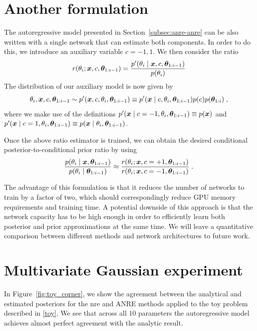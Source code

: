 \begin{subappendices}

\section{Another formulation} \label{apx:anre-anre}

 The autoregressive model presented in Section~\ref{subsec:anre-anre} can be also written with a single network that can estimate both components. In order to do this, we introduce an auxiliary variable $c = -1, 1$.  We then consider the ratio
\begin{equation}
    r(\theta_i; \bm{x}, c, \bm{\theta}_{1:i-1})
    =\frac
    {
    p'(\theta_i \mid \bm{x}, c, \bm{\theta}_{1:i-1})
    }{
    p(\theta_i)
    }
\end{equation}
The distribution of our auxiliary model is now given by
\begin{equation}
	\theta_i, \bm{x}, c, \bm{\theta}_{1:i-1} \sim p'(\bm{x} , c, \theta_i, \bm{\theta}_{1:i-1})\equiv p'(\bm{x} \mid c, \theta_i, \bm{\theta}_{1:i-1})p(c) p(\bm{\theta}_{1:i})\;,
\end{equation}
where we make use of the definitions
$p'(\bm{x} \mid c = -1, \theta_i, \bm{\theta}_{1:i-1}) \equiv p(\bm{x})$  and
$p'(\bm{x} \mid c = 1, \theta_i, \bm{\theta}_{1:i-1}) \equiv
p(\bm{x} \mid \theta_i, \bm{\theta}_{1:i-1})$.

Once the above ratio estimator is trained, we can obtain the desired conditional posterior-to-conditional prior ratio by using
\begin{equation}
\frac{
p(\theta_i \mid \bm{x}, \bm{\theta}_{1:i-1})
}{
p(\theta_i \mid \bm{\theta}_{1:i-1})
}
\approx
\frac{
r(\theta_i ; \bm{x}, c = +1, \bm{\theta}_{1:i-1})
}{
r(\theta_i ; \bm{x}, c = -1, \bm{\theta}_{1:i-1})
}\;.
\end{equation}

The advantage of this formulation is that it reduces the number of networks to train by a factor of two, which should correspondingly reduce GPU memory requirements and training time. A potential downside of this approach is that the network capacity has to be high enough in order to efficiently learn both posterior and prior approximations at the same time. We will leave a quantitative comparison between different methods and network architectures to future work.


\section{Multivariate Gaussian experiment}
\label{apx:anre-toy}
 In Figure~\ref{fig:toy_corner}, we show the agreement between the analytical and estimated posteriors for the \gls*{nre} and ANRE methods applied to the toy problem described in \autoref{toy}. We see that across all $10$ parameters the autoregressive model achieves almost perfect agreement with the analytic result.


\end{subappendices}
